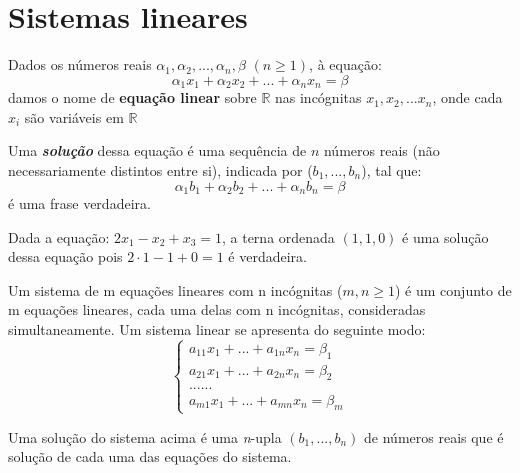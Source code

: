 \section{Sistemas lineares}

\begin{df}
Dados os números reais $\alpha_{1},\alpha_{2},...,\alpha_{n},\beta $ $(n\geqslant1)$, à equação:\\
\begin{equation*}
\alpha_{1}x_{1}+\alpha_{2}x_{2}+...+\alpha_{n}x_{n}=\beta
\end{equation*} 
damos o nome de \textbf{equação linear} sobre $\mathbb{R}$ nas incógnitas $x_{1},x_{2},...x_{n}$, onde cada $x_{i}$ são variáveis em $\mathbb{R}$\\

\end{df}

Uma \textbf{\textit{solução}} dessa equação é uma sequência de $n$ números reais (não necessariamente distintos entre si), indicada por ($b_{1},...,b_{n}$), tal que:\\
\begin{equation*}
\alpha_{1}b_{1}+\alpha_{2}b_{2}+...+\alpha_{n}b_{n}=\beta
\end{equation*} 
é uma frase verdadeira.

\begin{ex}
	Dada a equação: $2x_{1}-x_{2}+x_{3}=1$, a terna ordenada $(1,1,0)$ é uma solução dessa equação pois $2\cdot1-1+0=1$ é verdadeira.
\end{ex}
\begin{df}
	Um sistema de m equações lineares com n incógnitas ($m,n\geqslant1$) é um conjunto de m equações lineares, cada uma delas com n incógnitas, consideradas simultaneamente. Um sistema linear se apresenta do seguinte modo:\\
	\begin{equation*}
	\begin{cases}
	a_{11}x_{1}+...+a_{1n}x_{n}=\beta_{1} \\
	a_{21}x_{1}+...+a_{2n}x_{n}=\beta_{2} \\
	......\\
	a_{m1}x_{1}+...+a_{mn}x_{n}=\beta_{m} 
	\end{cases}
	\end{equation*} 
	 
\end{df}
Uma solução do sistema acima é uma \textit{n}-upla $(b_{1},...,b_{n})$ de números reais que é solução de cada uma das equações do sistema.

